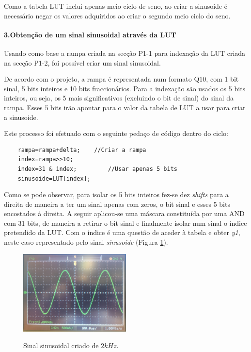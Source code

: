 \documentclass[11pt]{article}
\numberwithin{equation}{section}
\begin{document}
Como a tabela LUT inclui apenas meio ciclo de seno, ao criar a sinusoide é necessário negar os valores adquiridos ao criar o segundo meio ciclo do seno.

\paragraph{3.Obtenção de um sinal sinusoidal através da LUT} \hspace{0pt}

Usando como base a rampa criada na secção P1-1 para indexação da LUT criada na secção P1-2, foi possível criar um sinal  sinusoidal.

De acordo com o projeto, a rampa é representada num formato Q10, com 1 bit sinal, 5 bits inteiros e 10 bits fraccionários. 
Para a indexação são usados os 5 bits inteiros, ou seja, os 5 mais significativos (excluindo o bit de sinal) do sinal da rampa. Esses 5 bits irão apontar para o valor da tabela de LUT a usar para criar a sinusoide. 

Este processo foi efetuado com o seguinte pedaço de código dentro do ciclo:

\begin{lstlisting}
	rampa=rampa+delta;    //Criar a rampa
	index=rampa>>10;
	index=31 & index;         //Usar apenas 5 bits
	sinusoide=LUT[index];
\end{lstlisting}

Como se pode observar, para isolar os 5 bits inteiros fez-se dez \textit{shifts} para a direita de maneira a ter um sinal apenas com zeros, o bit sinal e esses 5 bits encostados à direita. A seguir aplicou-se uma máscara constituída por uma AND com 31 bits, de maneira a retirar o bit sinal e finalmente isolar num sinal o índice pretendido da LUT. Com o índice é uma questão de aceder à tabela e obter \textit{y1}, neste caso representado pelo sinal \textit{sinusoide} (Figura \ref{fig:sen2k}).

\begin{figure}[H]
	\centering
	\includegraphics[width=0.5\textwidth]{./P1_1seno}~\\
	\caption{Sinal sinusoidal criado de $ 2 kHz $.}
	\label{fig:sen2k}
\end{figure}
\end{document}
